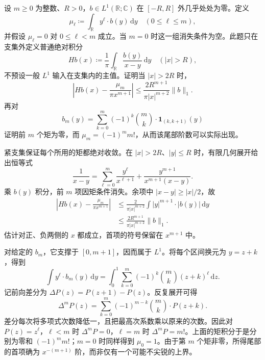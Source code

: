 \begin{exercise}\label{b2:ex:18-new-4}
设 \(m\geq0\) 为整数、\(R>0\)，\(b\in L^1(\mathbb R;\mathbb C)\) 在 \([-R,R]\) 外几乎处处为零。定义
\[
 \mu_\ell\coloneqq\int_{\mathbb R}y^\ell\cdot b(y)\,\mathrm dy
 \quad(0\leq\ell\leq m),
\]
并假设 \(\mu_\ell=0\) 对 \(0\leq\ell<m\) 成立。当 \(m=0\) 时这一组消失条件为空。此题只在支集外定义普通绝对积分
\[
 Hb(x)\coloneqq\frac1\pi\int_{\mathbb R}\frac{b(y)}{x-y}\,\mathrm dy
 \quad(|x|>R),
\]
不预设一般 \(L^1\) 输入在支集内的主值。证明当 \(|x|>2R\) 时，
\[
 \left|Hb(x)-\frac{\mu_m}{\pi x^{m+1}}\right|
 \leq\frac{2R^{m+1}}{\pi|x|^{m+2}}\|b\|_1.
\]
再对
\[
 b_m(y)=\sum_{k=0}^m(-1)^k\binom mk\cdot\mathbf1_{(k,k+1)}(y)
\]
证明前 \(m\) 个矩为零，而 \(\mu_m=(-1)^m m!\)，从而该尾部阶数可以实际出现。
\end{exercise}
\begin{solution}
紧支集保证每个所用的矩都绝对收敛。在 \(|x|>2R\)、\(|y|\leq R\) 时，有限几何展开给出恒等式
\[
 \frac1{x-y}=\sum_{\ell=0}^m\frac{y^\ell}{x^{\ell+1}}
                  +\frac{y^{m+1}}{x^{m+1}(x-y)}.
\]
乘 \(b(y)\) 积分，前 \(m\) 项因矩条件消失。余项中
\(|x-y|\geq|x|/2\)，故
\[
 \begin{aligned}
 \left|Hb(x)-\frac{\mu_m}{\pi x^{m+1}}\right|
 &\leq\frac2{\pi|x|^{m+2}}
             \int|y|^{m+1}\cdot|b(y)|\,\mathrm dy\\
 &\leq\frac{2R^{m+1}}{\pi|x|^{m+2}}\|b\|_1.
 \end{aligned}
\]
估计对正、负两侧的 \(x\) 都成立，首项的符号保留在 \(x^{m+1}\) 中。

对给定的 \(b_m\)，它支撑于 \([0,m+1]\)，因而属于 \(L^1\)。将每个区间换元为 \(y=z+k\)，得到
\[
 \int y^\ell\cdot b_m(y)\,\mathrm dy
 =\int_0^1\sum_{k=0}^m(-1)^k\binom mk(z+k)^\ell\,\mathrm dz.
\]
记前向差分为 \(\Delta P(z)=P(z+1)-P(z)\)。反复展开可得
\[
 \Delta^mP(z)=\sum_{k=0}^m(-1)^{m-k}\binom mk\cdot P(z+k).
\]
差分每次将多项式次数降低一，且把最高次系数乘以原来的次数。因此对 \(P(z)=z^\ell\)，\(\ell<m\) 时 \(\Delta^mP=0\)，\(\ell=m\) 时 \(\Delta^mP=m!\)。上面的矩积分于是分别为零和 \((-1)^m m!\)；\(m=0\) 时同样得到 \(\mu_0=1\)。由于第 \(m\) 个矩非零，所得尾部的首项确为 \(x^{-(m+1)}\) 阶，而非仅有一个可能不尖锐的上界。
\end{solution}

